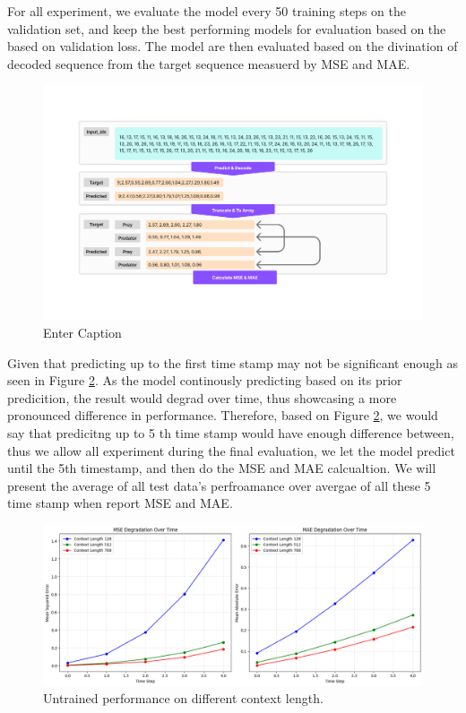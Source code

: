 \documentclass{article}
\begin{document}
For all experiment, we evaluate the model every 50 training steps on the validation set, and keep the best performing models for evaluation based on the based on validation loss. The model are then evaluated based on the divination of decoded sequence from the target sequence measuerd by MSE and MAE. 
\begin{figure}
    \centering
    \includegraphics[width=1\linewidth]{M2 Course Work//Images/Metric_calculation.png}
    \caption{Enter Caption}
    \label{fig:metric-calculation}
\end{figure}

Given that predicting up to the first time stamp may not be significant enough as seen in Figure \ref{fig:metric-diff-between-timestamp}. As the model continously predicting based on its prior predicition, the result would degrad over time, thus showcasing a more pronounced difference in performance. Therefore, based on  Figure \ref{fig:metric-diff-between-timestamp}, we would say that predicitng up to 5 th time stamp would have enough difference between, thus we allow all experiment during the final evaluation, we let the model predict until the 5th timestamp, and then do the MSE and MAE calcualtion. We will present the average of all test data's perfroamance over avergae of all these 5 time stamp when report MSE and MAE.

\begin{figure}
    \centering
    \includegraphics[width=1\linewidth]{M2 Course Work//Images/metric_diff_between_timestamp.png}
    \caption{Untrained performance on different context length. }
    \label{fig:metric-diff-between-timestamp}
\end{figure}
\end{document}
